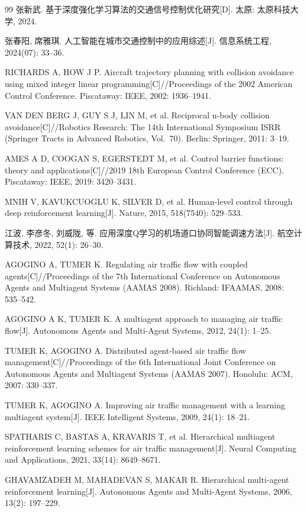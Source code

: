 \documentclass[12pt,a4paper,UTF8]{ctexart}
\begin{document}
\begin{thebibliography}{99}
 张新武. 基于深度强化学习算法的交通信号控制优化研究[D]. 太原: 太原科技大学, 2024.

 张春阳, 席雅琪. 人工智能在城市交通控制中的应用综述[J]. 信息系统工程, 2024(07): 33--36.

 RICHARDS A, HOW J P. Aircraft trajectory planning with collision avoidance using mixed integer linear programming[C]//Proceedings of the 2002 American Control Conference. Piscataway: IEEE, 2002: 1936--1941.

 VAN DEN BERG J, GUY S J, LIN M, et al. Reciprocal n-body collision avoidance[C]//Robotics Research: The 14th International Symposium ISRR (Springer Tracts in Advanced Robotics, Vol.\ 70). Berlin: Springer, 2011: 3--19.

 AMES A D, COOGAN S, EGERSTEDT M, et al. Control barrier functions: theory and applications[C]//2019 18th European Control Conference (ECC). Piscataway: IEEE, 2019: 3420--3431.

 MNIH V, KAVUKCUOGLU K, SILVER D, et al. Human-level control through deep reinforcement learning[J]. Nature, 2015, 518(7540): 529--533.

 江波, 李彦冬, 刘威陇, 等. 应用深度Q学习的机场道口协同智能调速方法[J]. 航空计算技术, 2022, 52(1): 26--30.

 AGOGINO A, TUMER K. Regulating air traffic flow with coupled agents[C]//Proceedings of the 7th International Conference on Autonomous Agents and Multiagent Systems (AAMAS 2008). Richland: IFAAMAS, 2008: 535--542.

 AGOGINO A K, TUMER K. A multiagent approach to managing air traffic flow[J]. Autonomous Agents and Multi-Agent Systems, 2012, 24(1): 1--25.

 TUMER K, AGOGINO A. Distributed agent-based air traffic flow management[C]//Proceedings of the 6th International Joint Conference on Autonomous Agents and Multiagent Systems (AAMAS 2007). Honolulu: ACM, 2007: 330--337.

 TUMER K, AGOGINO A. Improving air traffic management with a learning multiagent system[J]. IEEE Intelligent Systems, 2009, 24(1): 18--21.

 SPATHARIS C, BASTAS A, KRAVARIS T, et al. Hierarchical multiagent reinforcement learning schemes for air traffic management[J]. Neural Computing and Applications, 2021, 33(14): 8649--8671.

 GHAVAMZADEH M, MAHADEVAN S, MAKAR R. Hierarchical multi-agent reinforcement learning[J]. Autonomous Agents and Multi-Agent Systems, 2006, 13(2): 197--229.


\end{thebibliography}
\end{document}
